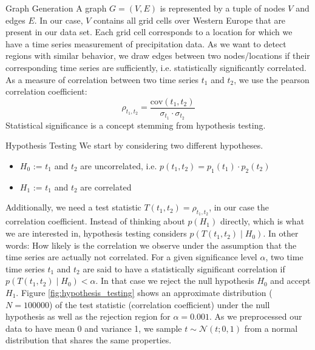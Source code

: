 \documentclass[12pt]{article}
\begin{document}
\begin{section}{Graph Generation}
A graph $G=(V,E)$ is represented by a tuple of nodes $V$ and edges $E$.
In our case, $V$ contains all grid cells over Western Europe that are present in our data set. 
Each grid cell corresponds to a location for which we have a time series measurement of precipitation data. 
As we want to detect regions with similar behavior, we draw edges between two nodes/locations if their corresponding time series are sufficiently, i.e. statistically significantly correlated.
As a measure of correlation between two time series $t_1$ and $t_2$, we use the pearson correlation coefficient: 
\begin{equation}
    \rho_{t_1, t_2} = \frac{\text{cov}(t_1, t_2)}{\sigma_{t_1}\cdot \sigma_{t_2}}
\end{equation}
Statistical significance is a concept stemming from hypothesis testing.

\begin{subsection}{Hypothesis Testing}
We start by considering two different hypotheses.
\begin{itemize}
    \item $H_0$ := $t_1$ and $t_2$ are uncorrelated, i.e. $p(t_1, t_2) = p_1(t_1) \cdot p_2(t_2)$
    \item $H_1$ := $t_1$ and $t_2$ are correlated
\end{itemize}
Additionally, we need a test statistic $T(t_1, t_2) = \rho_{t_1, t_2}$, in our case the correlation coefficient.
Instead of thinking about $p(H_1)$ directly, which is what we are interested in, hypothesis testing considers $p(T(t_1, t_2) \mid H_0)$.
In other words: How likely is the correlation we observe under the assumption that the time series are actually not correlated. For a given significance level $\alpha$, two time time series $t_1$ and $t_2$ are said to have a statistically significant correlation if $p(T(t_1, t_2) \mid H_0) < \alpha$. In that case we reject the null hypothesis $H_0$ and accept $H_1$.
Figure \ref{fig:hypothesis_testing} shows an approximate distribution ($N = 100000$) of the test statistic (correlation coefficient) under the null hypothesis as well as the rejection region for $\alpha = 0.001$. 
As we preprocessed our data to have mean 0 and variance 1, we sample $t \sim \mathcal{N}(t;0,1)$ from a normal distribution that shares the same properties.
\end{subsection}


\end{section}
\end{document}
